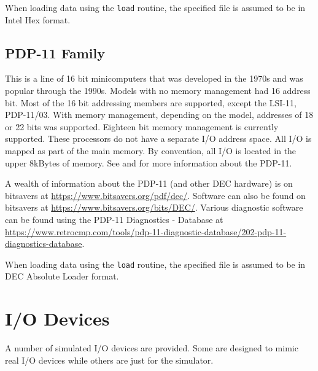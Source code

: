 \documentclass[10pt, openany]{book}
\newcommand{\function}[1]{\texttt{#1}}
\begin{document}
When loading data using the \function{load} routine, the specified file is assumed to be in Intel Hex format.

\subsection{PDP-11 Family}
This is a line of 16 bit minicomputers that was developed in the 1970s and was popular through the 1990s.
Models with no memory management had 16 address bit.
Most of the 16 bit addressing members are supported, except the LSI-11, PDP-11/03.
With memory management, depending on the model, addresses of 18 or 22 bits was supported.
Eighteen bit memory management is currently supported.
These processors do not have a separate I/O address space.
All I/O is mapped as part of the main memory.
By convention, all I/O is located in the upper 8kBytes of memory.
See \cite{dec80} and \cite{dec84} for more information about the PDP-11.

A wealth of information about the PDP-11 (and other DEC hardware) is on bitsavers at \url{https://www.bitsavers.org/pdf/dec/}.
Software can also be found on bitsavers at \url{https://www.bitsavers.org/bits/DEC/}.
Various diagnostic software can be found using the PDP-11 Diagnostics - Database at \url{https://www.retrocmp.com/tools/pdp-11-diagnostic-database/202-pdp-11-diagnostics-database}.

When loading data using the \function{load} routine, the specified file is assumed to be in DEC Absolute Loader format.

\section{I/O Devices}
\label{chap:IODev}
A number of simulated I/O devices are provided.
Some are designed to mimic real I/O devices while others are just for the simulator.
\end{document}
